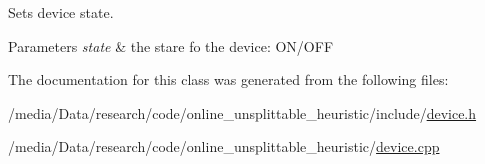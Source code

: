 \-Sets device state. 


\begin{DoxyParams}{\-Parameters}
{\em state} & the stare fo the device\-: \-O\-N/\-O\-F\-F \\
\hline
\end{DoxyParams}


\-The documentation for this class was generated from the following files\-:\begin{DoxyCompactItemize}
\item 
/media/\-Data/research/code/online\-\_\-unsplittable\-\_\-heuristic/include/\hyperlink{device_8h}{device.\-h}\item 
/media/\-Data/research/code/online\-\_\-unsplittable\-\_\-heuristic/\hyperlink{device_8cpp}{device.\-cpp}\end{DoxyCompactItemize}
